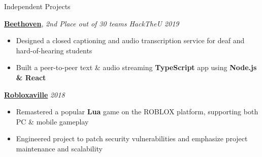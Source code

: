 \documentclass{resume/resume}
\begin{document}
\begin{rSection}{Independent Projects}
    
    \href{https://devpost.com/software/beethoven-t9ud86}{\bf Beethoven}, {\em 2nd Place out of 30 teams
    \hfill HackTheU 2019}
    \vspace{-6pt}
    \begin{itemize}[nosep]
        \item Designed a closed captioning and audio transcription service for deaf and hard-of-hearing students
        \item Built a peer-to-peer text \& audio streaming {\bf TypeScript} app using {\bf Node.js \& React}
    \end{itemize}

    \href{https://www.roblox.com/games/849680368/Robloxaville-Next-Generation-BETA}{\bf Robloxaville} \hfill {\em 2018}
    \vspace{-6pt}
    \begin{itemize}[nosep]
      \item Remastered a popular {\bf Lua} game on the ROBLOX platform, supporting both PC \& mobile gameplay
      \item Engineered project to patch security vulnerabilities and emphasize project maintenance and scalability 
    \end{itemize}
    
    
    

\end{rSection}
\end{document}
